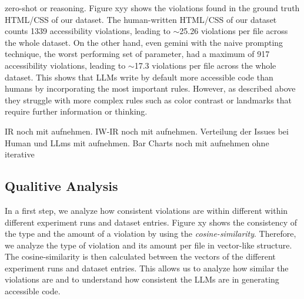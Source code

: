 zero-shot or reasoning.\newline
Figure xyy shows the violations found in the ground truth HTML/CSS of our 
dataset. The human-written HTML/CSS of our dataset counts 1339 accessibility 
violations, leading to $\sim$25.26 violations per file across the whole dataset.
On the other hand, even gemini with the naive prompting technique,
the worst performing set of parameter, had a maximum of 917 accessibility 
violations, leading to $\sim$17.3 violations per file across the whole dataset.
This shows that LLMs write by default more accessible code than humans by 
incorporating the most important rules. However, as described above they 
struggle with more complex rules such as color contrast or landmarks
that require further information or thinking.

IR noch mit aufnehmen.
IW-IR noch mit aufnehmen.
Verteilung der Issues bei Human und LLms mit aufnehmen.
Bar Charts noch mit aufnehmen ohne iterative


\subsection{Qualitive Analysis}
In a first step, we analyze how consistent violations are within different 
within different experiment runs and dataset entries. Figure xy shows the 
consistency of the type and the amount of a violation by using the 
\textit{cosine-similarity}. Therefore, we analyze the type of violation
and its amount per file in vector-like structure. 
The cosine-similarity is then calculated between the vectors of the 
different experiment runs and dataset entries. This allows us to 
analyze how similar the violations are and to understand how consistent
the LLMs are in generating accessible code.

\newcommand{\vect}[1]{\begin{pmatrix}#1\end{pmatrix}}
\newcommand{\issues}{k}                   %
\newcommand{\vx}{\mathbf x}
\newcommand{\vy}{\mathbf y}

